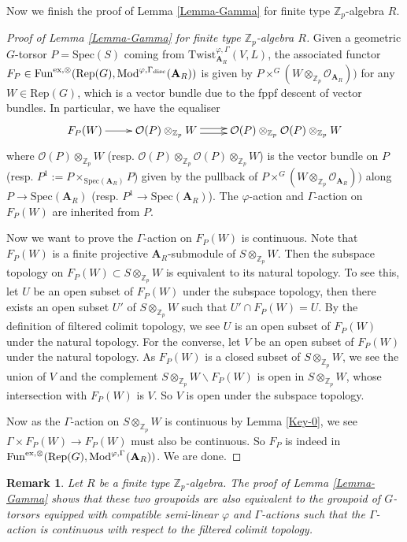 \documentclass[10pt]{article}
\newtheorem{rmk}[thm]{Remark}
\numberwithin{equation}{section}
\newcommand{\bZ}{{\mathbb Z}}
\newcommand{\calO}{{\mathcal O}}
\newcommand{\Mod}{{\mathrm{Mod}}}           %
\newcommand{\Rep}{{\mathrm{Rep}}}           %
\newcommand{\Spec}{{\mathrm{Spec}}}         %
\newcommand{\bfA}{{\textbf{A}}}
\newcommand{\Fun}{\mathrm{Fun}}
\newcommand{\Twist}{\mathrm{Twist}}
\newcommand{\disc}{\mathrm{disc}}
\begin{document}
Now we finish the proof of Lemma \ref{Lemma-Gamma} for finite type $\bZ_p$-algebra $R$.
\begin{proof}[Proof of Lemma \ref{Lemma-Gamma} for finite type $\bZ_p$-algebra $R$]
    Given a geometric $G$-torsor $P=\Spec(S)$ coming from $\Twist^{\varphi,\Gamma}_{\bfA_R}(V,L)$, the associated functor $F_P\in \Fun^{{\rm ex},\otimes}(\Rep(G),\Mod^{\varphi,\Gamma_{\disc}}(\bfA_R))$ is given by $P\times^G(W\otimes_{\bZ_p}\calO_{\bfA_R}))$ for any $W\in \Rep(G)$, which is a vector bundle due to the fppf descent of vector bundles. In particular, we have the equaliser
    \begin{equation}\label{equaliser}
    \xymatrix{
    F_P(W)\ar[r] & \calO(P)\otimes_{\bZ_p}W\ar@<.5ex>[r]\ar@<-.5ex>[r] &\calO(P)\otimes_{\bZ_p} \calO(P)\otimes_{\bZ_p}W
    }
\end{equation}
where $\calO(P)\otimes_{\bZ_p}W$ (resp. $\calO(P)\otimes_{\bZ_p} \calO(P)\otimes_{\bZ_p}W$) is the vector bundle on $P$ (resp. $P^1:=P\times_{\Spec(\bfA_R)}P$) given by the pullback of $P\times^G(W\otimes_{\bZ_p}\calO_{\bfA_R}))$ along $P\to \Spec(\bfA_R)$ (resp. $P^1\to \Spec(\bfA_R)$). The $\varphi$-action and $\Gamma$-action on $F_P(W)$ are inherited from $P$. 

Now we want to prove the $\Gamma$-action on $F_P(W)$ is continuous. Note that $F_P(W)$  is a finite projective $\bfA_R$-submodule of $S\otimes_{\bZ_p}W$. Then the subspace topology on $F_P(W)\subset S\otimes_{\bZ_p}W$ is equivalent to its natural topology. To see this, let $U$ be an open subset of $F_P(W)$ under the subspace topology, then there exists an open subset $U'$ of $S\otimes_{\bZ_p}W$ such that $U'\cap F_P(W)=U$. By the definition of filtered colimit topology, we see $U$ is an open subset of $F_P(W)$ under the natural topology. For the converse, let $V$ be an open subset of $F_P(W)$ under the natural topology. As $F_P(W)$ is a closed subset of $S\otimes_{\bZ_p}W$, we see the union of $V$ and the complement $S\otimes_{\bZ_p}W\backslash F_P(W)$ is open in $S\otimes_{\bZ_p}W$, whose intersection with $F_P(W)$ is $V$. So $V$ is open under the subspace topology.

Now as the $\Gamma$-action on $S\otimes_{\bZ_p}W$ is continuous by Lemma \ref{Key-0}, we see $\Gamma\times F_P(W)\to F_P(W)$ must also be continuous. So $F_P$ is indeed in $\Fun^{{\rm ex},\otimes}(\Rep(G),\Mod^{\varphi,\Gamma_{}}(\bfA_R))$. We are done.
\end{proof}

\begin{rmk}
    Let $R$ be a finite type $\bZ_p$-algebra. The proof of Lemma \ref{Lemma-Gamma} shows that these two groupoids are also equivalent to the groupoid of $G$-torsors equipped with compatible semi-linear $\varphi$ and $\Gamma$-actions such that the $\Gamma$-action is continuous with respect to the filtered colimit topology.
\end{rmk}
\end{document}
